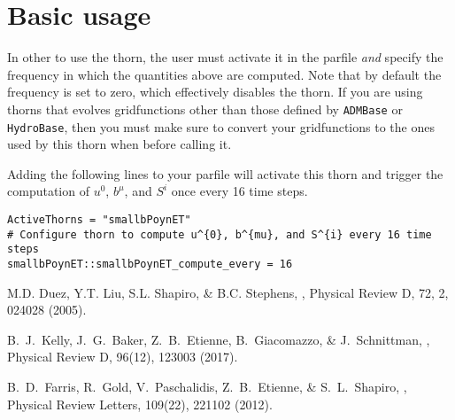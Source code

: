 \section{Basic usage}
\label{sec:basic_usage}

In other to use the \thornname{} thorn, the user must activate it in the
parfile \emph{and} specify the frequency in which the quantities above
are computed. Note that by default the frequency is set to zero, which
effectively disables the thorn. If you are using thorns that evolves
gridfunctions other than those defined by \texttt{ADMBase} or
\texttt{HydroBase}, then you must make sure to convert your
gridfunctions to the ones used by this thorn when before calling it.

Adding the following lines to your parfile will activate this thorn and
trigger the computation of $u^{0}$, $b^{\mu}$, and $S^{i}$ once every 16
time steps.

\begin{verbatim}
ActiveThorns = "smallbPoynET"
# Configure thorn to compute u^{0}, b^{mu}, and S^{i} every 16 time steps
smallbPoynET::smallbPoynET_compute_every = 16
\end{verbatim}

\begin{thebibliography}{3}

  M.D. Duez, Y.T. Liu, S.L. Shapiro, \& B.C. Stephens,
  ,
  Physical Review D, 72, 2, 024028 (2005).

  B.~J.~Kelly, J.~G.~Baker, Z.~B.~Etienne, B.~Giacomazzo, \& J.~Schnittman, 
  ,
  Physical Review D, 96(12), 123003 (2017).

  B.~D.~Farris, R.~Gold, V.~Paschalidis, Z.~B.~Etienne, \& S.~L.~Shapiro,
  ,
  Physical Review Letters, 109(22), 221102 (2012).

\end{thebibliography}




